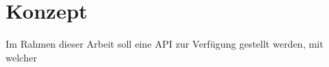\section{Konzept} \label{sec:Konzept}
Im Rahmen dieser Arbeit soll eine API zur Verfügung gestellt werden, mit welcher 